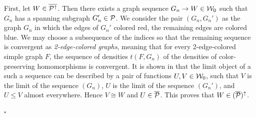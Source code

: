 \documentclass{article}
\newenvironment{proof}{\medskip\noindent{\bf Proof. }}{\hfill$\square$\medskip}
\begin{document}
\begin{proof}
First, let $W\in\overline{\mathcal{P}^\uparrow}$. Then there exists a graph
sequence $G_n\to W\in\mathcal{W}_0$ such that $G_n$ has a spanning subgraph
$G_n'\in\mathcal{P}$. We consider the pair $(G_n,G_n')$ as the graph $G_n$ in
which the edges of $G_n'$ colored red, the remaining edges are
colored blue. We may choose a subsequence of the indices so that the
remaining sequence is convergent as {\it 2-edge-colored graphs},
meaning that for every 2-edge-colored simple graph $F$, the sequence
of densities $t(F,G_n)$ of the densities of color-preserving
homomorphisms is convergent. It is shown in \cite{LSz3} that the
limit object of a such a sequence can be described by a pair of
functions $U,V\in\mathcal{W}_0$, such that $V$ is the limit of the sequence
$(G_n)$, $U$ is the limit of the sequence $(G_n')$, and $U\le V$
almost everywhere. Hence $V\cong W$ and $U\in\overline{\mathcal{P}}$. This
proves that $W\in (\overline{\mathcal{P}})^\uparrow$.


\end{proof}
\end{document}

